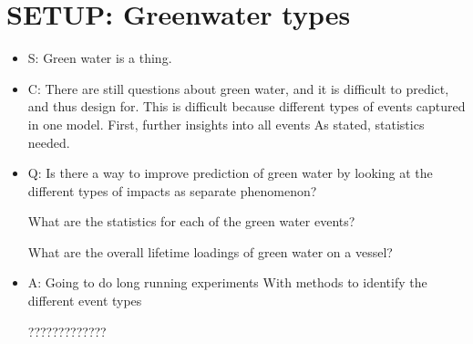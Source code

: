 \chapter{SETUP: Greenwater types}
\begin{itemize}
	\item S:
	Green water is a thing.
	
	\item C:
	There are still questions about green water, and it is difficult to predict, and thus design for. 
	This is difficult because different types of events captured in one model.
	First, further insights into all events
	As stated, statistics needed.
	
	\item Q:
	Is there a way to improve prediction of green water by looking at the different types of impacts as separate phenomenon?
	
	What are the statistics for each of the green water events?
	
	What are the overall lifetime loadings of green water on a vessel?
	
	
	\item A:
	Going to do long running experiments
	With methods to identify the different event types
	
	?????????????
\end{itemize}
 
